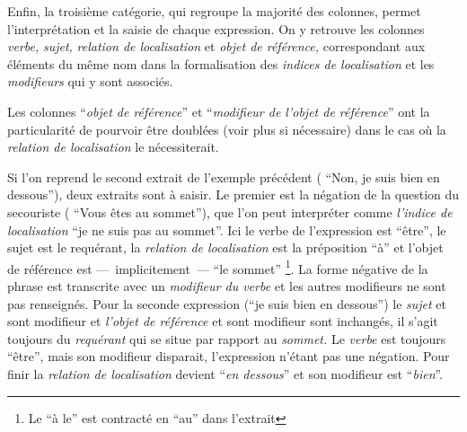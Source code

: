 Enfin, la troisième catégorie, qui regroupe la majorité des colonnes,
permet l'interprétation et la saisie de chaque expression. On y
retrouve les colonnes \emph{verbe,} \emph{sujet,} \emph{relation de
  localisation} et \emph{objet de référence,} correspondant aux
éléments du même nom dans la formalisation des \emph{indices de
  localisation} et les \emph{modifieurs} qui y sont associés.


Les colonnes \enquote{\emph{objet de référence}} et
\enquote{\emph{modifieur de l'objet de référence}} ont la
particularité de pourvoir être doublées (voir plus si nécessaire) dans
le cas où la \emph{relation de localisation} le nécessiterait.

Si l'on reprend le second extrait de l'exemple précédent (\ie
\enquote{Non, je suis bien en dessous}), deux extraits sont à
saisir. Le premier est la négation de la question du secouriste (\ie
\enquote{Vous êtes au sommet}), que l'on peut interpréter comme
\emph{l'indice de localisation} \enquote{je ne suis pas au
  sommet}. Ici le verbe de l'expression est \enquote{être}, le sujet
est le requérant, la \emph{relation de localisation} est la
préposition \enquote{à} et l'objet de référence est
---~implicitement~--- \enquote{le sommet} \footnote{Le \enquote{à le}
  est contracté en \enquote{au} dans l'extrait}. La forme négative de
la phrase est transcrite avec un \emph{modifieur du verbe} et les
autres modifieurs ne sont pas renseignés. Pour la seconde expression
(\ie \enquote{je suis bien en dessous}) le \emph{sujet} et sont
modifieur et \emph{l'objet de référence} et sont modifieur sont
inchangés, il s'agit toujours du \emph{requérant} qui se situe par
rapport au \emph{sommet.} Le \emph{verbe} est toujours \enquote{être},
mais son modifieur disparait, l'expression n'étant pas une
négation. Pour finir la \emph{relation de localisation} devient
\enquote{\emph{en dessous}} et son modifieur est
\enquote{\emph{bien}}.

